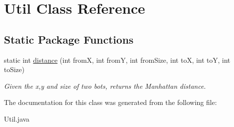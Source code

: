 \hypertarget{classUtil}{
\section{Util Class Reference}
\label{classUtil}
}
\subsection*{Static Package Functions}
\begin{DoxyCompactItemize}
\item 
\hypertarget{classUtil_a43667b1f4731fb4e189323473618d7f4}{
static int \hyperlink{classUtil_a43667b1f4731fb4e189323473618d7f4}{distance} (int fromX, int fromY, int fromSize, int toX, int toY, int toSize)}
\label{classUtil_a43667b1f4731fb4e189323473618d7f4}

\begin{DoxyCompactList}\small\item\em Given the x,y and size of two bots, returns the Manhattan distance. \item\end{DoxyCompactList}\end{DoxyCompactItemize}


The documentation for this class was generated from the following file:\begin{DoxyCompactItemize}
\item 
Util.java\end{DoxyCompactItemize}
